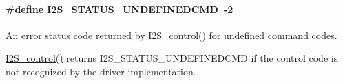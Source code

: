 \paragraph[{I2\+S\+\_\+\+S\+T\+A\+T\+U\+S\+\_\+\+U\+N\+D\+E\+F\+I\+N\+E\+D\+C\+M\+D}]{\setlength{\rightskip}{0pt plus 5cm}\#define I2\+S\+\_\+\+S\+T\+A\+T\+U\+S\+\_\+\+U\+N\+D\+E\+F\+I\+N\+E\+D\+C\+M\+D~-\/2}\label{group___i2_s___s_t_a_t_u_s_ga649cf0c869381728fc9b56dfdbbd3e3d}


An error status code returned by \hyperlink{_i2_s_8h_a1af19b22e9036bee696b4e4efe4916b0}{I2\+S\+\_\+control()} for undefined command codes. 

\hyperlink{_i2_s_8h_a1af19b22e9036bee696b4e4efe4916b0}{I2\+S\+\_\+control()} returns I2\+S\+\_\+\+S\+T\+A\+T\+U\+S\+\_\+\+U\+N\+D\+E\+F\+I\+N\+E\+D\+C\+M\+D if the control code is not recognized by the driver implementation. 